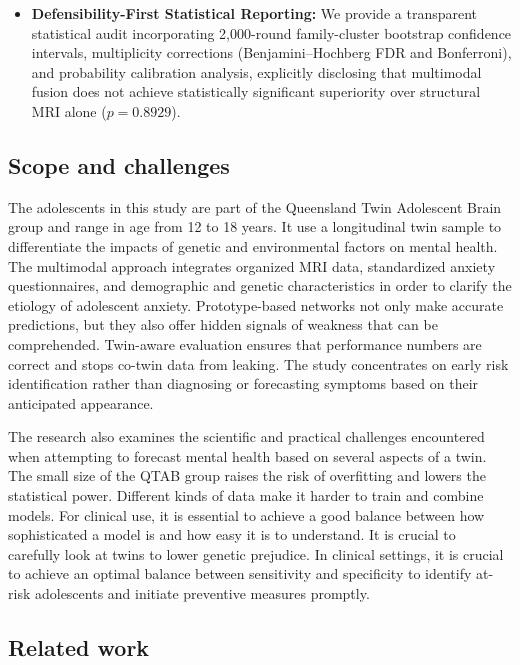 \documentclass[10pt,letterpaper]{article}
\begin{document}
\begin{itemize}
        \item \textbf{Defensibility-First Statistical Reporting:} We provide a transparent statistical audit incorporating 2,000-round family-cluster bootstrap confidence intervals, multiplicity corrections (Benjamini--Hochberg FDR and Bonferroni), and probability calibration analysis, explicitly disclosing that multimodal fusion does not achieve statistically significant superiority over structural MRI alone ($p = 0.8929$).
        
        \end{itemize}

\subsection*{Scope and challenges}
        The adolescents in this study are part of the Queensland Twin Adolescent Brain group and range in age from 12 to 18 years. It use a longitudinal twin sample to differentiate the impacts of genetic and environmental factors on mental health. The multimodal approach integrates organized MRI data, standardized anxiety questionnaires, and demographic and genetic characteristics in order to clarify the etiology of adolescent anxiety. Prototype-based networks not only make accurate predictions, but they also offer hidden signals of weakness that can be comprehended. Twin-aware evaluation ensures that performance numbers are correct and stops co-twin data from leaking. The study concentrates on early risk identification rather than diagnosing or forecasting symptoms based on their anticipated appearance.

        The research also examines the scientific and practical challenges encountered when attempting to forecast mental health based on several aspects of a twin. The small size of the QTAB group raises the risk of overfitting and lowers the statistical power. Different kinds of data make it harder to train and combine models. For clinical use, it is essential to achieve a good balance between how sophisticated a model is and how easy it is to understand. It is crucial to carefully look at twins to lower genetic prejudice. In clinical settings, it is crucial to achieve an optimal balance between sensitivity and specificity to identify at-risk adolescents and initiate preventive measures promptly.

        \subsection*{Related work}
\end{document}
